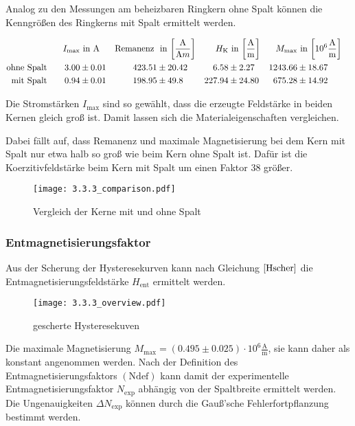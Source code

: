 \documentclass[12pt,a4paper]{scrartcl}
\numberwithin{equation}{section} %
\renewcommand{\[}{} %
\renewcommand{\]}{\noindent} %
\begin{document}
Analog zu den Messungen am beheizbaren Ringkern ohne Spalt können die
Kenngrößen des Ringkerns mit Spalt ermittelt werden.

\[
\begin{align*}
    I_\mathrm{max} &\text{ in } \mathrm A &
        \text{Remanenz } &\text{ in }
            {\tiny \left[ \frac{\mathrm A}{\mathrm Am} \right] } &
        H_\mathrm{K} &\text{ in }
            {\tiny \left[ \frac{\mathrm A}{\mathrm m} \right] } &
        M_\mathrm{max} &\text{ in }
            {\tiny \left[10^6 \frac{\mathrm A}{\mathrm m} \right] }
        \\
    \text{ohne Spalt}\qquad
        3.00 &\pm 0.01 &
        423.51 &\pm 20.42 &
        6.58 &\pm 2.27 &
        1243.66 &\pm 18.67
        \\
    \text{mit Spalt}\qquad
        0.94 &\pm 0.01 &
        198.95 &\pm 49.8 &
        227.94 &\pm 24.80 &
        675.28 &\pm 14.92 &
\end{align*}
\]

Die Stromstärken \(I_\mathrm{max}\) sind so gewählt, dass die erzeugte
Feldstärke in beiden Kernen gleich groß ist. Damit lassen sich die
Materialeigenschaften vergleichen.

Dabei fällt auf, dass Remanenz und maximale Magnetisierung bei dem Kern
mit Spalt nur etwa halb so groß wie beim Kern ohne Spalt ist. Dafür ist
die Koerzitivfeldstärke beim Kern mit Spalt um einen Faktor \(38\)
größer.

\begin{figure}
\centering
\texttt{[image: 3.3.3\_comparison.pdf]}
\caption{Vergleich der Kerne mit und ohne Spalt}
\end{figure}

\hypertarget{entmagnetisierungsfaktor-1}{%
\subsubsection{Entmagnetisierungsfaktor}\label{entmagnetisierungsfaktor-1}}

Aus der Scherung der Hysteresekurven kann nach Gleichung
\(\eqref{Hscher}\) die Entmagnetisierungsfeldstärke \(H_\mathrm{ent}\)
ermittelt werden.

\begin{figure}
\centering
\texttt{[image: 3.3.3\_overview.pdf]}
\caption{gescherte Hysteresekuven}
\end{figure}

Die maximale Magnetisierung
\(M_\mathrm{max} = (0.495\pm 0.025) \cdot 10^6 \mathrm{\frac{A}{m}}\),
sie kann daher als konstant angenommen werden. Nach der Definition des
Entmagnetisierungsfaktors \((\mathrm{Ndef})\) kann damit der
experimentelle Entmagnetisierungsfaktor \(N_\mathrm{exp}\) abhängig von
der Spaltbreite ermittelt werden. Die Ungenauigkeiten
\(\Delta N_\mathrm{exp}\) können durch die Gauß'sche Fehlerfortpflanzung
bestimmt werden.
\end{document}
